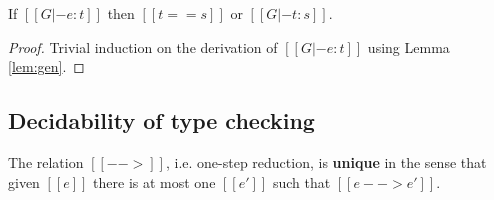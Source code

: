 \begin{lem}\label{lem:corrtyp}
    If $[[G |- e:t]]$ then $[[t == s]]$ or $[[G |- t : s]]$.
\end{lem}

\begin{proof}
    Trivial induction on the derivation of $[[G |- e:t]]$ using Lemma \ref{lem:gen}.
\end{proof}

\subsection{Decidability of type checking}
\begin{lem}\label{lem:unired}
	The relation $[[-->]]$, i.e. one-step reduction, is \textbf{unique} in the sense that given $[[e]]$ there is at most one $[[e']]$ such that $[[e --> e']]$.
\end{lem}

